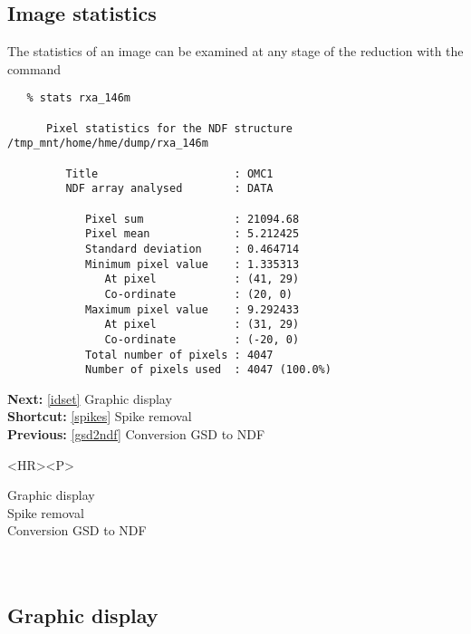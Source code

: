 \subsection{\label{stats}Image statistics}

   The statistics of an image can be examined at any stage of the
   reduction with the command
{\tt {}}

\begin{verbatim}
   % stats rxa_146m

      Pixel statistics for the NDF structure /tmp_mnt/home/hme/dump/rxa_146m

         Title                     : OMC1
         NDF array analysed        : DATA

            Pixel sum              : 21094.68
            Pixel mean             : 5.212425
            Standard deviation     : 0.464714
            Minimum pixel value    : 1.335313
               At pixel            : (41, 29)
               Co-ordinate         : (20, 0)
            Maximum pixel value    : 9.292433
               At pixel            : (31, 29)
               Co-ordinate         : (-20, 0)
            Total number of pixels : 4047
            Number of pixels used  : 4047 (100.0%)
\end{verbatim}

\begin{latexonly}
{\bf Next:} \ref{idset} Graphic display\\
{\bf Shortcut:} \ref{spikes} Spike removal\\
{\bf Previous:} \ref{gsd2ndf} Conversion GSD to NDF\\
\end{latexonly}

\begin{htmlonly}
\begin{rawhtml} <HR><P> \end{rawhtml}
{\bf {}} Graphic display\\
{\bf {}} Spike removal\\
{\bf {}} Conversion GSD to NDF\\
{\bf {}}\\
{\bf {}}\\
\end{htmlonly}


\subsection{\label{idset}Graphic display}


